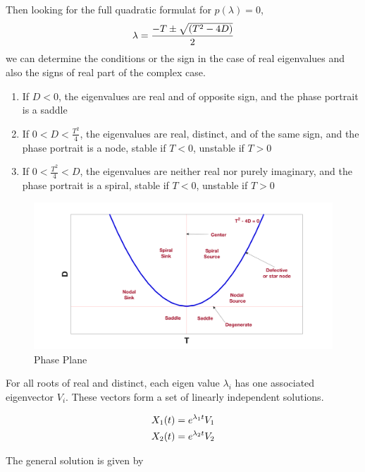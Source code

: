 \documentclass[fleqn,10pt]{SelfArx} %
\begin{document}
Then looking for the full quadratic formulat for $p(\lambda) = 0$,
\begin{equation} \centering
\lambda  = \frac{-T\pm \sqrt{(T^2 - 4D)}}{2}
\label{eq:lambda2}
\end{equation}
we can determine the conditions or the sign in the case of real eigenvalues and also the signs of real part of the complex case. 

\begin{enumerate}
\item If $D < 0$, the eigenvalues are real and of opposite sign, and the phase portrait is a saddle
\item If $0<D<\frac{T^2}{4}$, the eigenvalues are real, distinct, and of the same sign, and the phase portrait is a node, stable if $T < 0$, unstable if $T>0$
\item If $0 < \frac{T^2}{4} < D$, the eigenvalues are neither real nor purely imaginary, and the phase portrait is a spiral, stable if $T < 0$, unstable if $T > 0$
\end{enumerate}

\begin{figure}[ht]\centering
\includegraphics[width=\linewidth]{gpport}
\caption{Phase Plane}
\label{fig:gpport}
\end{figure}

For all roots of real and distinct, each eigen value $\lambda_i$ has one associated eigenvector $V_i$. These vectors form a set of linearly independent solutions. 

\begin{equation} \centering
\begin{split}
X_1(t) &= e^{\lambda_1 t}V_1  \\
X_2(t) &= e^{\lambda_2 t}V_2
\end{split}
\label{eq:ge}
\end{equation}

The general solution is given by 
\end{document}
